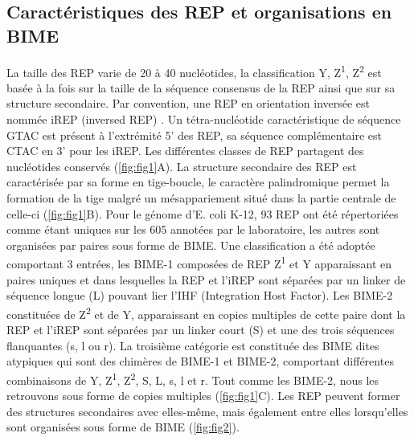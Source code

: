 \documentclass[12pt,a4paper]{report}
\begin{document}
\begin{onehalfspace}
\section*{Caractéristiques des REP et organisations en BIME}
La taille des REP varie de 20 à 40 nucléotides, la classification Y, Z\textsuperscript{1}, Z\textsuperscript{2} est basée à la fois sur la taille de la séquence consensus de la REP ainsi que sur sa structure secondaire. Par convention, une REP en orientation inversée est nommée iREP (inversed REP) \citep{Ton-Hoang2012}. Un tétra-nucléotide caractéristique de séquence GTAC est présent à l'extrémité 5' des REP, sa séquence complémentaire est CTAC en 3' pour les iREP. Les différentes classes de REP partagent des nucléotides conservés (\autoref{fig:fig1}A). La structure secondaire des REP est caractérisée par sa forme en tige-boucle, le caractère palindromique permet la formation de la tige malgré un mésappariement situé dans la partie centrale de celle-ci (\autoref{fig:fig1}B). Pour le génome d'E. coli K-12, 93 REP ont été répertoriées comme étant uniques sur les 605 annotées par le laboratoire, les autres sont organisées par paires sous forme de BIME. Une classification a été adoptée comportant 3 entrées, les BIME-1 composées de REP Z\textsuperscript{1} et Y apparaissant en paires uniques et dans lesquelles la REP et l'iREP sont séparées par un linker de séquence longue (L) pouvant lier l'IHF (Integration Host Factor). Les BIME-2 constituées de Z\textsuperscript{2} et de Y, apparaissant en copies multiples de cette paire dont la REP et l'iREP sont séparées par un linker court (S) et une des trois séquences flanquantes (s, l ou r). La troisième catégorie est constituée des BIME dites atypiques qui sont des chimères de BIME-1 et BIME-2, comportant différentes combinaisons de Y, Z\textsuperscript{1}, Z\textsuperscript{2}, S, L, s, l et r. Tout comme les BIME-2, nous les retrouvons sous forme de copies multiples (\autoref{fig:fig1}C). Les REP peuvent former des structures secondaires avec elles-même, mais également entre elles lorsqu'elles sont organisées sous forme de BIME (\autoref{fig:fig2}).


\end{onehalfspace}
\end{document}
